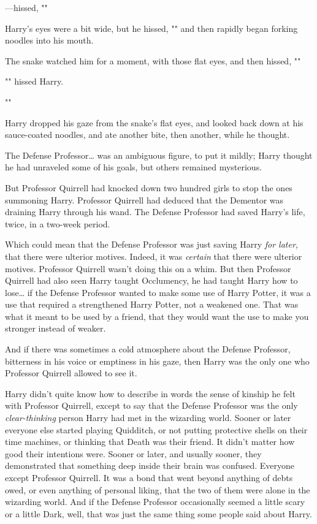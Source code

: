 ---hissed, ""

Harry's eyes were a bit wide, but he hissed, "" 
and then rapidly began forking noodles into his mouth.

The snake watched him for a moment, with those flat eyes, and then hissed, 
""

"" hissed Harry.

""

Harry dropped his gaze from the snake's flat eyes, and looked back down at his 
sauce-coated noodles, and ate another bite, then another, while he thought.

The Defense Professor{\ldots} was an ambiguous figure, to put it mildly; Harry 
thought he had unraveled some of his goals, but others remained mysterious.

But Professor Quirrell had knocked down two hundred girls to stop the ones 
summoning Harry. Professor Quirrell had deduced that the Dementor was draining 
Harry through his wand. The Defense Professor had saved Harry's life, twice, in 
a two-week period.

Which could mean that the Defense Professor was just saving Harry \emph{for 
later,} that there were ulterior motives. Indeed, it was \emph{certain} that 
there were ulterior motives. Professor Quirrell wasn't doing this on a whim. 
But then Professor Quirrell had also seen Harry taught Occlumency, he had 
taught Harry how to lose{\ldots} if the Defense Professor wanted to make some 
use of Harry Potter, it was a use that required a strengthened Harry Potter, 
not a weakened one. That was what it meant to be used by a friend, that they 
would want the use to make you stronger instead of weaker.

And if there was sometimes a cold atmosphere about the Defense Professor, 
bitterness in his voice or emptiness in his gaze, then Harry was the only one 
who Professor Quirrell allowed to see it.

Harry didn't quite know how to describe in words the sense of kinship he felt 
with Professor Quirrell, except to say that the Defense Professor was the only 
\emph{clear-thinking} person Harry had met in the wizarding world. Sooner or 
later everyone else started playing Quidditch, or not putting protective shells 
on their time machines, or thinking that Death was their friend. It didn't 
matter how good their intentions were. Sooner or later, and usually sooner, 
they demonstrated that something deep inside their brain was confused. Everyone 
except Professor Quirrell. It was a bond that went beyond anything of debts 
owed, or even anything of personal liking, that the two of them were alone in 
the wizarding world. And if the Defense Professor occasionally seemed a little 
scary or a little Dark, well, that was just the same thing some people said 
about Harry.

